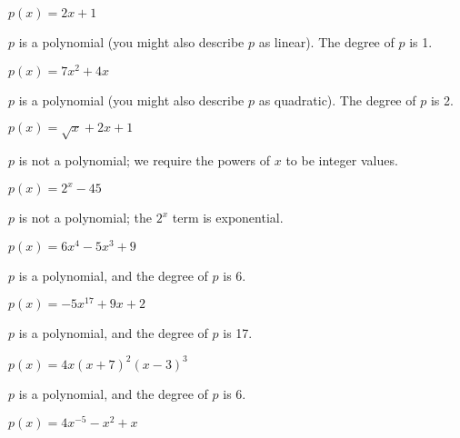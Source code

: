 \begin{exercises}
\begin{problem}
	 \begin{multicols}{3}
		 \begin{subproblem}
			 $p(x)=2x+1$
			 \begin{shortsolution}
				 $p$ is a polynomial (you might also describe $p$ as linear). The degree of $p$ is 1.
			 \end{shortsolution}
		 \end{subproblem}
		 \begin{subproblem}
			 $p(x)=7x^2+4x$
			 \begin{shortsolution}
				 $p$ is a polynomial (you might also describe $p$ as quadratic). The degree of $p$ is 2.
			 \end{shortsolution}
		 \end{subproblem}
		 \begin{subproblem}
			 $p(x)=\sqrt{x}+2x+1$
			 \begin{shortsolution}
				 $p$ is not a polynomial; we require the powers of $x$ to be integer values.
			 \end{shortsolution}
		 \end{subproblem}
		 \begin{subproblem}
			 $p(x)=2^x-45$
			 \begin{shortsolution}
				 $p$ is not a polynomial; the $2^x$ term is exponential.
			 \end{shortsolution}
		 \end{subproblem}
		 \begin{subproblem}
			 $p(x)=6x^4-5x^3+9$
			 \begin{shortsolution}
				 $p$ is a polynomial, and the degree of $p$ is $6$.
			 \end{shortsolution}
		 \end{subproblem}
		 \begin{subproblem}
			 $p(x)=-5x^{17}+9x+2$
			 \begin{shortsolution}
				 $p$ is a polynomial, and the degree of $p$ is 17.
			 \end{shortsolution}
		 \end{subproblem}
		 \begin{subproblem}
			 $p(x)=4x(x+7)^2(x-3)^3$
			 \begin{shortsolution}
				 $p$ is a polynomial, and the degree of $p$ is $6$.
			 \end{shortsolution}
		 \end{subproblem}
		 \begin{subproblem}
			 $p(x)=4x^{-5}-x^2+x$
			 \begin{shortsolution}

\end{shortsolution}
\end{subproblem}
\end{multicols}
\end{problem}
\end{exercises}
